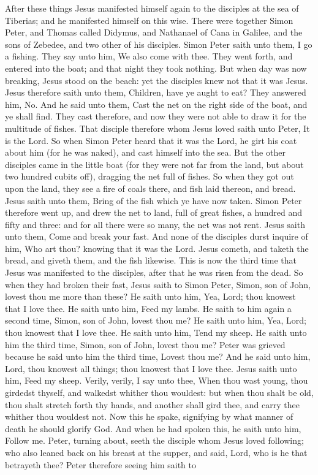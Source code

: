 After these things Jesus manifested himself again to the disciples at the sea of Tiberias; and he manifested himself on this wise. There were together Simon Peter, and Thomas called Didymus, and Nathanael of Cana in Galilee, and the sons of Zebedee, and two other of his disciples. Simon Peter saith unto them, I go a fishing. They say unto him, We also come with thee. They went forth, and entered into the boat; and that night they took nothing. But when day was now breaking, Jesus stood on the beach: yet the disciples knew not that it was Jesus. Jesus therefore saith unto them, Children, have ye aught to eat? They answered him, No. And he said unto them, Cast the net on the right side of the boat, and ye shall find. They cast therefore, and now they were not able to draw it for the multitude of fishes. That disciple therefore whom Jesus loved saith unto Peter, It is the Lord. So when Simon Peter heard that it was the Lord, he girt his coat about him (for he was naked), and cast himself into the sea. But the other disciples came in the little boat (for they were not far from the land, but about two hundred cubits off), dragging the net full of fishes. So when they got out upon the land, they see a fire of coals there, and fish laid thereon, and bread. Jesus saith unto them, Bring of the fish which ye have now taken. Simon Peter therefore went up, and drew the net to land, full of great fishes, a hundred and fifty and three: and for all there were so many, the net was not rent. Jesus saith unto them, Come and break your fast. And none of the disciples durst inquire of him, Who art thou? knowing that it was the Lord. Jesus cometh, and taketh the bread, and giveth them, and the fish likewise. This is now the third time that Jesus was manifested to the disciples, after that he was risen from the dead.  So when they had broken their fast, Jesus saith to Simon Peter, Simon, son of John, lovest thou me more than these? He saith unto him, Yea, Lord; thou knowest that I love thee. He saith unto him, Feed my lambs. He saith to him again a second time, Simon, son of John, lovest thou me? He saith unto him, Yea, Lord; thou knowest that I love thee. He saith unto him, Tend my sheep. He saith unto him the third time, Simon, son of John, lovest thou me? Peter was grieved because he said unto him the third time, Lovest thou me? And he said unto him, Lord, thou knowest all things; thou knowest that I love thee. Jesus saith unto him, Feed my sheep. Verily, verily, I say unto thee, When thou wast young, thou girdedst thyself, and walkedst whither thou wouldest: but when thou shalt be old, thou shalt stretch forth thy hands, and another shall gird thee, and carry thee whither thou wouldest not. Now this he spake, signifying by what manner of death he should glorify God. And when he had spoken this, he saith unto him, Follow me. Peter, turning about, seeth the disciple whom Jesus loved following; who also leaned back on his breast at the supper, and said, Lord, who is he that betrayeth thee? Peter therefore seeing him saith to 